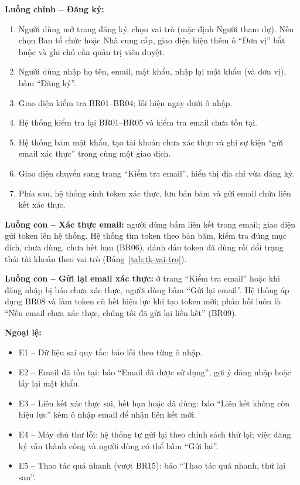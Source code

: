 \textbf{Luồng chính -- Đăng ký:}
\begin{enumerate}
  \item Người dùng mở trang đăng ký, chọn vai trò (mặc định Người tham dự). Nếu chọn Ban tổ chức hoặc
  Nhà cung cấp, giao diện hiện thêm ô ``Đơn vị'' bắt buộc và ghi chú cần quản trị viên duyệt.
  \item Người dùng nhập họ tên, email, mật khẩu, nhập lại mật khẩu (và đơn vị), bấm ``Đăng ký''.
  \item Giao diện kiểm tra BR01--BR04; lỗi hiện ngay dưới ô nhập.
  \item Hệ thống kiểm tra lại BR01--BR05 và kiểm tra email chưa tồn tại.
  \item Hệ thống băm mật khẩu, tạo tài khoản chưa xác thực và ghi sự kiện ``gửi email xác thực'' trong
  cùng một giao dịch.
  \item Giao diện chuyển sang trang ``Kiểm tra email'', hiển thị địa chỉ vừa đăng ký.
  \item Phía sau, hệ thống sinh token xác thực, lưu bản băm và gửi email chứa liên kết xác thực.
\end{enumerate}

\textbf{Luồng con -- Xác thực email:} người dùng bấm liên kết trong email; giao diện gửi token lên hệ
thống. Hệ thống tìm token theo bản băm, kiểm tra đúng mục đích, chưa dùng, chưa hết hạn (BR06), đánh
dấu token đã dùng rồi đổi trạng thái tài khoản theo vai trò (Bảng~\ref{tab:tk-vai-tro}).

\textbf{Luồng con -- Gửi lại email xác thực:} ở trang ``Kiểm tra email'' hoặc khi đăng nhập bị báo chưa
xác thực, người dùng bấm ``Gửi lại email''. Hệ thống áp dụng BR08 và làm token cũ hết hiệu lực khi
tạo token mới; phản hồi luôn là ``Nếu email chưa xác thực, chúng tôi đã gửi lại liên kết'' (BR09).

\textbf{Ngoại lệ:}
\begin{itemize}
  \item E1 -- Dữ liệu sai quy tắc: báo lỗi theo từng ô nhập.
  \item E2 -- Email đã tồn tại: báo ``Email đã được sử dụng'', gợi ý đăng nhập hoặc lấy lại mật khẩu.
  \item E3 -- Liên kết xác thực sai, hết hạn hoặc đã dùng: báo ``Liên kết không còn hiệu lực'' kèm ô
  nhập email để nhận liên kết mới.
  \item E4 -- Máy chủ thư lỗi: hệ thống tự gửi lại theo chính sách thử lại; việc đăng ký vẫn thành
  công và người dùng có thể bấm ``Gửi lại''.
  \item E5 -- Thao tác quá nhanh (vượt BR15): báo ``Thao tác quá nhanh, thử lại sau''.
\end{itemize}

